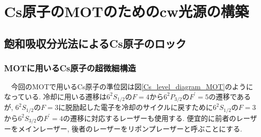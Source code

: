\documentclass[uplatex, dvipdfmx, a4paper, report, papersize, 11pt]{jsbook}
\begin{document}
\chapter{Cs原子のMOTのためのcw光源の構築}
\section{飽和吸収分光法によるCs原子のロック}
\subsection{MOTに用いるCs原子の超微細構造}
　今回のMOTで用いるCs原子の準位図は図\ref{Cs_level_diagram_MOT}のようになっている. 冷却に用いる遷移は$6 ^ { 2 } S _ { 1 / 2 }$の$F = 4$から$6 ^ { 2 } P _ { 3 / 2 }$の$F ^ { \prime } = 5$の遷移であるが, $6 ^ { 2 } S _ { 1 / 2 }$の$F = 3$に脱励起した電子を冷却のサイクルに戻すために$6 ^ { 2 } S _ { 1 / 2 }$の$F = 3$
から$6 ^ { 2 } S _ { 3 / 2 }$の$F ^ { \prime } = 4$の遷移に対応するレーザーも使用する. 便宜的に前者のレーザーをメインレーザー, 後者のレーザーをリポンプレーザーと呼ぶことにする.
\end{document}
